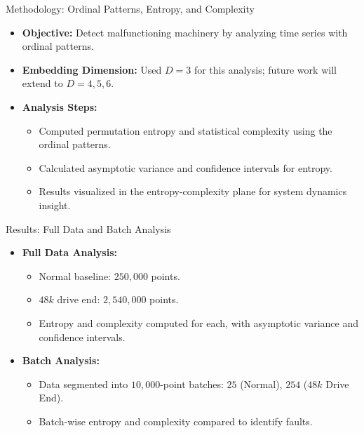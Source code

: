 \documentclass{beamer}
\begin{document}
\begin{frame}{Methodology: Ordinal Patterns, Entropy, and Complexity}
	\begin{itemize}
		\item \textbf{Objective:} Detect malfunctioning machinery by analyzing time series with ordinal patterns.
		\item \textbf{Embedding Dimension:} Used $D = 3$ for this analysis; future work will extend to $D = 4, 5, 6$.
		\item \textbf{Analysis Steps:}
		\begin{itemize}
			\item Computed permutation entropy and statistical complexity using the ordinal patterns.
			\item Calculated asymptotic variance and confidence intervals for entropy.
			\item Results visualized in the entropy-complexity plane for system dynamics insight.
		\end{itemize}
	\end{itemize}
\end{frame}

\begin{frame}{Results: Full Data and Batch Analysis}
	\begin{itemize}
		\item \textbf{Full Data Analysis:}
		\begin{itemize}
			\item Normal baseline: $250,\!000$ points.
			\item $48k$ drive end: $2,\!540,\!000$ points.
			\item Entropy and complexity computed for each, with asymptotic variance and confidence intervals.
		\end{itemize}
		\item \textbf{Batch Analysis:}
		\begin{itemize}
			\item Data segmented into $10,\!000$-point batches: $25$ (Normal), $254$ ($48k$ Drive End).
			\item Batch-wise entropy and complexity compared to identify faults.
		\end{itemize}
	\end{itemize}
\end{frame}
\end{document}
